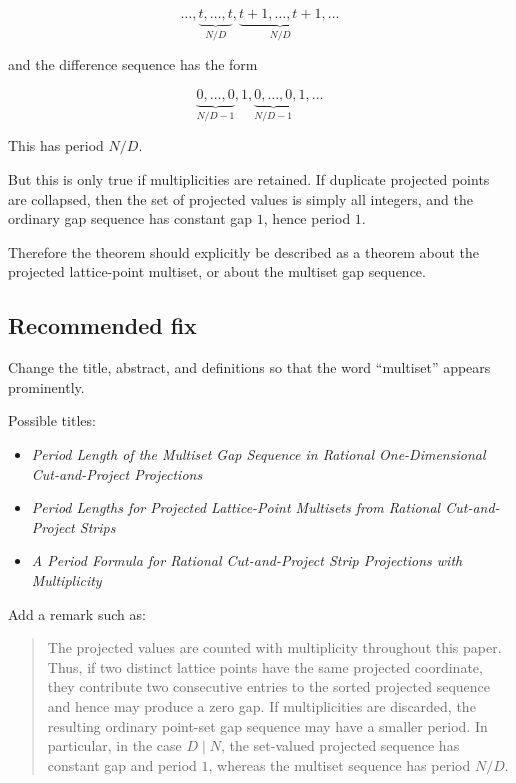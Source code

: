 \documentclass[11pt]{article}
\begin{document}
\[
\ldots,
\underbrace{t,\ldots,t}_{N/D},
\underbrace{t+1,\ldots,t+1}_{N/D},
\ldots
\]

and the difference sequence has the form

\[
\underbrace{0,\ldots,0}_{N/D-1},1,
\underbrace{0,\ldots,0}_{N/D-1},1,\ldots
\]

This has period \(N/D\).

But this is only true if multiplicities are retained.  If duplicate projected
points are collapsed, then the set of projected values is simply all integers,
and the ordinary gap sequence has constant gap \(1\), hence period \(1\).

Therefore the theorem should explicitly be described as a theorem about the
projected lattice-point multiset, or about the multiset gap sequence.

\subsection*{Recommended fix}

Change the title, abstract, and definitions so that the word ``multiset''
appears prominently.

Possible titles:

\begin{itemize}
    \item \emph{Period Length of the Multiset Gap Sequence in Rational
    One-Dimensional Cut-and-Project Projections}

    \item \emph{Period Lengths for Projected Lattice-Point Multisets from
    Rational Cut-and-Project Strips}

    \item \emph{A Period Formula for Rational Cut-and-Project Strip
    Projections with Multiplicity}
\end{itemize}

Add a remark such as:

\begin{quote}
The projected values are counted with multiplicity throughout this paper.
Thus, if two distinct lattice points have the same projected coordinate, they
contribute two consecutive entries to the sorted projected sequence and hence
may produce a zero gap.  If multiplicities are discarded, the resulting
ordinary point-set gap sequence may have a smaller period.  In particular, in
the case \(D \mid N\), the set-valued projected sequence has constant gap and
period \(1\), whereas the multiset sequence has period \(N/D\).
\end{quote}
\end{document}
